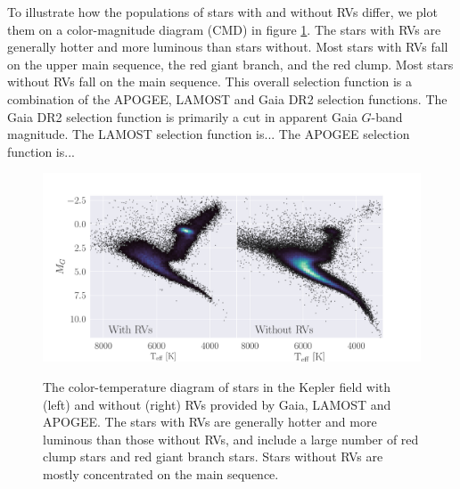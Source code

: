 To illustrate how the populations of stars with and without RVs differ, we
plot them on a color-magnitude diagram (CMD) in figure \ref{fig:CMD}.
The stars with RVs are generally hotter and more luminous than stars without.
Most stars with RVs fall on the upper main sequence, the red giant branch, and
the red clump.
Most stars without RVs fall on the main sequence.
This overall selection function is a combination of the APOGEE, LAMOST and
Gaia DR2 selection functions.
The Gaia DR2 selection function is primarily a cut in apparent Gaia $G$-band
magnitude.
The LAMOST selection function is...
The APOGEE selection function is...
\begin{figure}[ht!]
\caption{
    The color-temperature diagram of stars in the Kepler field with (left)
    and without (right) RVs provided by Gaia, LAMOST and APOGEE.
    The stars with RVs are generally hotter and more luminous than those
    without RVs, and include a large number of red clump stars and red giant
    branch stars.
    Stars without RVs are mostly concentrated on the main sequence.
}
  \centering \includegraphics[width=1\textwidth]{CMD}
\label{fig:CMD}
\end{figure}
